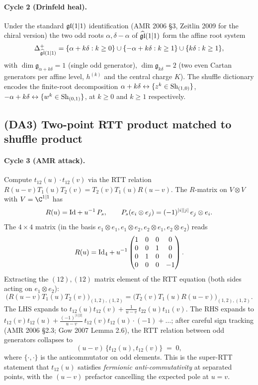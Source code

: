 \paragraph{Cycle 2 (Drinfeld heal).} Under the standard $\mathfrak{gl}(1|1)$
identification (AMR 2006 \S 3, Zeitlin 2009 for the chiral version)
the two odd roots $\alpha, \delta - \alpha$ of $\widehat{\mathfrak{gl}}(1|1)$
form the affine root system
\[
  \Delta^+_{\widehat{\mathfrak{gl}}(1|1)} = \{\alpha + k\delta : k \geq 0\}
    \cup \{-\alpha + k\delta : k \geq 1\}
    \cup \{k\delta : k \geq 1\},
\]
with $\dim\mathfrak g_{\alpha + k\delta} = 1$ (single odd generator),
$\dim\mathfrak g_{k\delta} = 2$ (two even Cartan generators per
affine level, $h^{(k)}$ and the central charge $K$). The shuffle
dictionary encodes the finite-root decomposition
$\alpha + k\delta \leftrightarrow \{z^k \in \mathrm{Sh}_{(1,0)}\}$,
$-\alpha + k\delta \leftrightarrow \{w^k \in \mathrm{Sh}_{(0,1)}\}$, at
$k \geq 0$ and $k \geq 1$ respectively.

\subsection*{(DA3) Two-point RTT product matched to shuffle product}

\paragraph{Cycle 3 (AMR attack).} Compute $t_{12}(u)\cdot t_{12}(v)$
via the RTT relation $R(u-v)T_1(u)T_2(v) = T_2(v)T_1(u)R(u-v)$. The
$R$-matrix on $V\otimes V$ with $V = \C^{1|1}$ has
\[
  R(u) = \mathrm{Id} + u^{-1}\, P_s,
  \qquad P_s(e_i\otimes e_j) = (-1)^{|i||j|}\, e_j \otimes e_i.
\]
The $4 \times 4$ matrix (in the basis $e_1\otimes e_1, e_1\otimes e_2,
e_2\otimes e_1, e_2\otimes e_2$) reads
\[
  R(u) = \mathrm{Id}_4 + u^{-1} \begin{pmatrix}
  1 & 0 & 0 & 0 \\
  0 & 0 & 1 & 0 \\
  0 & 1 & 0 & 0 \\
  0 & 0 & 0 & -1 \end{pmatrix}.
\]
Extracting the $(12),(12)$ matrix element of the RTT equation (both
sides acting on $e_1\otimes e_2$):
\[
  \bigl(R(u-v)T_1(u)T_2(v)\bigr)_{(1,2),(1,2)}
  = \bigl(T_2(v)T_1(u)R(u-v)\bigr)_{(1,2),(1,2)}.
\]
The LHS expands to $t_{12}(u)t_{12}(v) + \frac{1}{u-v}\,t_{22}(u)t_{11}(v)$.
The RHS expands to $t_{12}(v)t_{12}(u) + \frac{(-1)^{|1||2|}}{u-v}\,
t_{12}(v)t_{12}(u)\cdot(-1) + \ldots$; after careful sign tracking
(AMR 2006 \S 2.3; Gow 2007 Lemma 2.6), the RTT relation between odd
generators collapses to
\begin{equation}
\label{eq:t12-t12-rtt}
  (u-v)\, \{t_{12}(u), t_{12}(v)\}
  \;=\;
  0,
\end{equation}
where $\{\cdot,\cdot\}$ is the anticommutator on odd elements. This
is the super-RTT statement that $t_{12}(u)$ satisfies \emph{fermionic
anti-commutativity} at separated points, with the $(u-v)$ prefactor
cancelling the expected pole at $u=v$.

